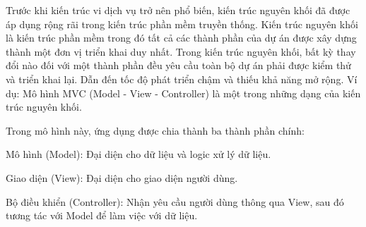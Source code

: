 Trước khi kiến trúc vi dịch vụ trở nên phổ biến, kiến trúc nguyên khối đã được áp dụng rộng rãi trong kiến trúc phần mềm truyền thống.      Kiến trúc nguyên khối là kiến trúc phần mềm trong đó tất cả các thành phần của dự án được xây dựng thành một đơn vị triển khai duy nhất.
Trong kiến trúc nguyên khối, bất kỳ thay đổi nào đối với một thành phần đều yêu cầu toàn bộ  dự án  phải được kiểm thử và triển khai lại. Dẫn đến  tốc độ phát triển   chậm và   thiếu khả năng mở rộng.
Ví dụ: Mô hình MVC (Model - View - Controller) là một trong những dạng của kiến trúc nguyên khối.

Trong mô hình này, ứng dụng được chia thành ba thành phần chính:

Mô hình (Model): Đại diện cho dữ liệu và logic xử lý dữ liệu.

Giao diện (View): Đại diện cho giao diện người dùng.

Bộ điều khiển (Controller): Nhận yêu cầu người dùng thông qua View, sau đó tương tác với Model để làm việc với dữ liệu.


